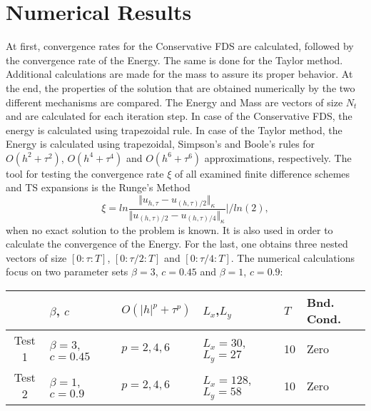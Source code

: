 \documentclass[%
 aip,
cp,  %
 amsmath,amssymb,%
 reprint,%
]{revtex4-2}
\begin{document}
\section{Numerical Results}

At first, convergence rates for the Conservative FDS are calculated, followed by the convergence rate of the Energy. The same is done for the Taylor method. Additional calculations are made for the mass to assure its proper behavior. At the end, the properties of the solution that are obtained numerically by the two different mechanisms are compared. The Energy and Mass are vectors of size $N_t$ and are calculated for each iteration step. In case of the Conservative FDS, the energy is calculated using trapezoidal rule. In case of the Taylor method, the Energy is calculated using trapezoidal, Simpson's and Boole's rules for $O(h^{2} + \tau^2 )$, $O(h^{4} + \tau^4 )$ and $O(h^{6} + \tau^6 )$ approximations, respectively. The tool for testing the convergence rate $\xi$ of all examined finite difference schemes and TS expansions is the Runge's Method
\begin{equation}\label{Runge}
\xi = ln  \frac{\Vert u_{h,\tau} - u_{(h,\tau)/2} \Vert_\kappa } {\Vert  u_{(h,\tau)/2} - u_{(h,\tau)/4} \Vert_\kappa  } | / ln(2),
\end{equation}
when no exact solution to the problem is known. It is also used in order to calculate the convergence of the Energy. For the last, one obtains three nested vectors of size $[0:\tau:T]$, $[0:\tau/2:T]$ and $[0:\tau/4:T]$. The numerical calculations focus on two parameter sets $\beta = 3$, $c=0.45$ and $\beta = 1$, $c=0.9$:

\begin{table}[ht]
\centering
\small
		\begin{tabular}{||c|l|l|l|l|l||}
			\hline
			\hline
                                            &    $\beta$, $c$                              & $O(|h|^p + \tau^p)$                                 & $L_x$,$L_y$                                & $T$      &  Bnd. Cond.   \\

   			\hline 
					\hline 
           Test 1                        &      $\beta = 3$, $c=0.45$           &      $p=2, 4, 6$                              & $L_x = 30$,$L_y=27$                &                10    &    Zero  \\
	   \hline
			\hline 
           Test 2                        &      $\beta = 1$, $c=0.9$             &      $p=2, 4, 6$                              & $L_x = 128$,$L_y=58$                &               10    &   Zero  \\
	   \hline
			\hline 
		\end{tabular}

\end{table}
\end{document}
